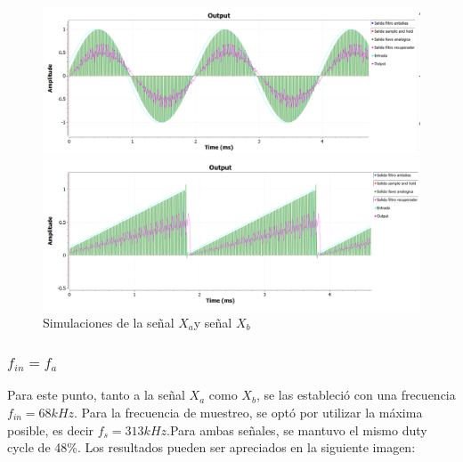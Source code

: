 \documentclass[../../ASSD_TP1_G7.tex]{subfiles}
\begin{document}
\begin{figure}[H]

\begin{centering}
\includegraphics[scale=0.5]{Imagenes/simulacion_llave_seno_b1}
\par\end{centering}
\begin{centering}
\includegraphics[scale=0.5]{Imagenes/simulacion_llave_diente_b1}\caption{Simulaciones de la señal $X_{a}$y señal $X_{b}$ }
\par\end{centering}
\end{figure}


\subsubsection{$f_{in}=f_{a}$}

Para este punto, tanto a la señal $X_{a}$ como $X_{b}$, se las estableció
con una frecuencia $f_{in}=68kHz$. Para la frecuencia de muestreo,
se optó por utilizar la máxima posible, es decir $f_{s}=313kHz.$Para
ambas señales, se mantuvo el mismo duty cycle de 48\%. Los resultados
pueden ser apreciados en la siguiente imagen:
\end{document}
